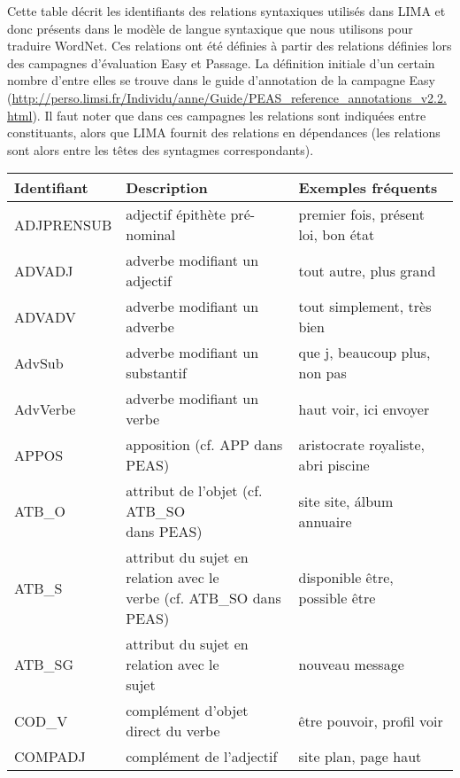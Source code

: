 \documentclass[oneside,parskip,draft]{scrbook}
\makeatletter
\newcommand{\specialcell}[2][l]{%
      \begin{tabular}[#1]{@{}l@{}}#2\end{tabular}}
\makeatother
\begin{document}
Cette table décrit les identifiants des relations syntaxiques utilisés dans
LIMA et donc présents dans le modèle de langue syntaxique que nous utilisons
pour traduire WordNet. Ces relations ont été définies à partir des relations
définies lors des campagnes d'évaluation Easy et Passage. La définition
initiale d'un certain nombre d'entre elles se trouve dans le guide d'annotation
de la campagne Easy
(\url{http://perso.limsi.fr/Individu/anne/Guide/PEAS_reference_annotations_v2.2.html}).
Il faut noter que dans ces campagnes les relations sont indiquées entre
constituants, alors que LIMA fournit des relations en dépendances (les
relations sont alors entre les têtes des syntagmes correspondants).

\begin{longtable}{lll}
    \toprule
    Identifiant   & Description & Exemples fréquents \\ \midrule
    ADJPRENSUB    &  adjectif épithète pré-nominal         & premier fois, présent loi, bon état \\ \midrule
    ADVADJ        &  adverbe modifiant un adjectif         & tout autre, plus grand \\ \midrule
    ADVADV        &  adverbe modifiant un adverbe          & tout simplement, très bien \\ \midrule
    AdvSub        &  adverbe modifiant un substantif       & que j, beaucoup plus, non pas \\ \midrule
    AdvVerbe      &  adverbe modifiant un verbe            & haut voir, ici envoyer \\ \midrule
    APPOS         &  apposition (cf. APP dans PEAS)        & aristocrate royaliste, abri piscine \\ \midrule
    ATB\_O        &  \specialcell{attribut de l'objet (cf. ATB\_SO \\ dans PEAS)} & site site, álbum annuaire \\ \midrule
    ATB\_S        &  \specialcell{attribut du sujet en relation avec le \\ verbe (cf. ATB\_SO dans PEAS)} & disponible être, possible être \\ \midrule
    ATB\_SG       &  \specialcell{attribut du sujet en relation avec le \\ sujet} & nouveau message \\ \midrule
    COD\_V        &  complément d'objet direct du verbe    & être pouvoir,  profil voir \\ \midrule
    COMPADJ       &  complément de l'adjectif              & site plan, page haut \\ \midrule

\end{longtable}
\end{document}

